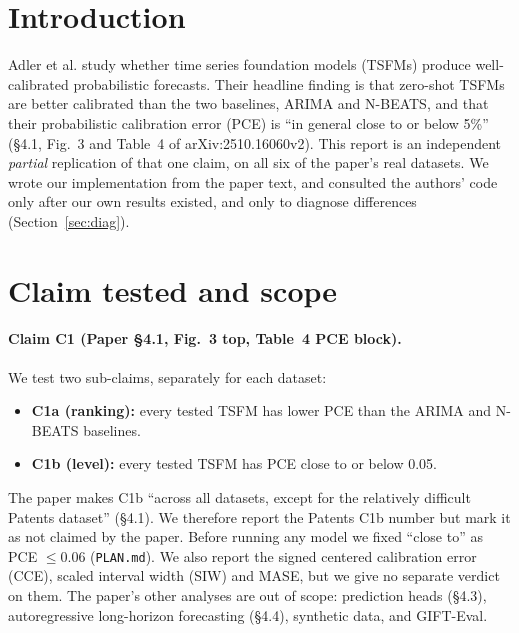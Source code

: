 
\sloppy


\section{Introduction}

Adler et al.\supercite{adler2026beyond} study whether time series foundation models (TSFMs) produce
well-calibrated probabilistic forecasts. Their headline finding is that zero-shot TSFMs
are better calibrated than the two baselines, ARIMA and N-BEATS\supercite{oreshkin2020nbeats}, and that their
probabilistic calibration error (PCE) is ``in general close to or below 5\%'' (\S4.1, Fig.~3 and Table~4 of
arXiv:2510.16060v2). This report is an independent \emph{partial} replication of that one claim, on all six of
the paper's real datasets.
We wrote our implementation from the paper text, and consulted the authors' code\supercite{authorsrepo}
only after our own results existed, and only to diagnose differences (Section~\ref{sec:diag}).

\section{Claim tested and scope}
\label{sec:scope}

\paragraph{Claim C1 (Paper \S4.1, Fig.~3 top, Table~4 PCE block).} We test two sub-claims, separately for each dataset:
\begin{itemize}
\item \textbf{C1a (ranking):} every tested TSFM has lower PCE than the ARIMA and N-BEATS baselines.
\item \textbf{C1b (level):} every tested TSFM has PCE close to or below 0.05.
\end{itemize}
The paper makes C1b ``across all datasets, except for the relatively difficult Patents dataset'' (\S4.1). We
therefore report the Patents C1b number but mark it as not claimed by the paper.
Before running any model we fixed ``close to'' as PCE $\le 0.06$ (\texttt{PLAN.md}). We also report the
signed centered calibration error (CCE), scaled interval width (SIW) and MASE, but we give no separate verdict on them.
The paper's other analyses are out of scope: prediction heads (\S4.3), autoregressive long-horizon forecasting (\S4.4),
synthetic data, and GIFT-Eval.

